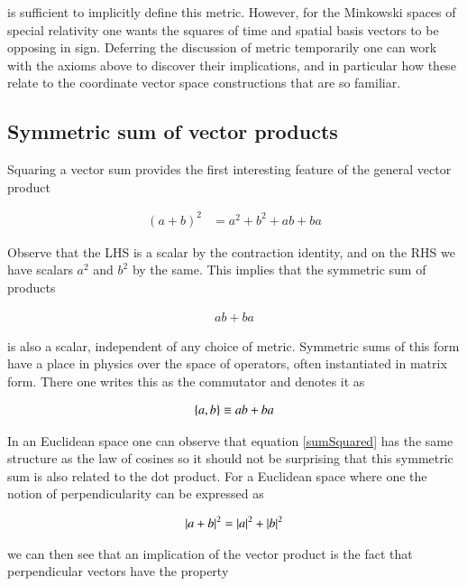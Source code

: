 is sufficient to implicitly define this metric.  However, for the Minkowski spaces of special relativity one wants the squares of time and spatial basis vectors to be opposing in sign.  Deferring the discussion of metric temporarily one can work with the axioms above to discover their implications, and in particular how these relate to the coordinate vector space constructions that are so familiar.

\subsection{ Symmetric sum of vector products }

Squaring a vector sum provides the first interesting feature of the general vector product

\begin{align}\label{sumSquared}
(a + b)^2 %
&= a^2 + b^2 + a b + b a
\end{align}

Observe that the LHS is a scalar by the contraction identity, and on the RHS we have scalars $a^2$ and $b^2$ by the same.  This implies that the symmetric sum of products

\begin{align*}
a b + b a
\end{align*}

is also a scalar, independent of any choice of metric.  Symmetric sums of this form have a place in physics over the space of operators, often instantiated in matrix form.  There one writes this as the commutator and denotes it as

\begin{align}\label{eqn:anticommutator}
{\left\{{a},{b}\right\}} \equiv a b + b a
\end{align}

In an Euclidean space one can observe that equation \ref{sumSquared} has the same structure as the law of cosines so it should not be surprising that this symmetric sum is also related to the dot product.  For a Euclidean space where one the notion of perpendicularity can be expressed as

\begin{align*}
\left\lvert{ a + b }\right\rvert^2 = \left\lvert{a}\right\rvert^2 + \left\lvert{b}\right\rvert^2
\end{align*}

we can then see that an implication of the vector product is the fact that perpendicular vectors have the property

